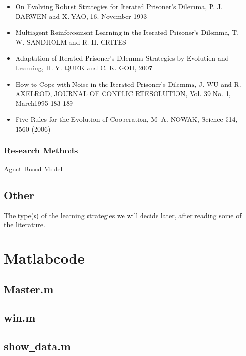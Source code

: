 \begin{itemize}
\item On Evolving Robust Strategies for Iterated Prisoner's Dilemma, P. J. DARWEN and X. YAO, 16. November 1993\\
\item Multiagent Reinforcement Learning in the Iterated Prisoner's Dilemma, T. W. SANDHOLM and R. H. CRITES\\
\item Adaptation of Iterated Prisoner's Dilemma Strategies by Evolution and Learning, H. Y. QUEK and C. K. GOH, 2007\\
\item How to Cope with Noise in the Iterated Prisoner's Dilemma, J. WU and R. AXELROD, JOURNAL OF CONFLIC RTESOLUTION, Vol. 39 No. 1, March1995 183-189\\
\item Five Rules for the Evolution of Cooperation, M. A. NOWAK, Science 314, 1560 (2006)\\
\end{itemize}
\subsubsection{Research Methods}

Agent-Based Model

\subsection{Other}
The type(s) of the learning strategies we will decide later, after reading some of the literature.

\clearpage

\section{Matlabcode}

\subsection{Master.m}


\subsection{win.m}


\subsection{show\underline\ data.m}

